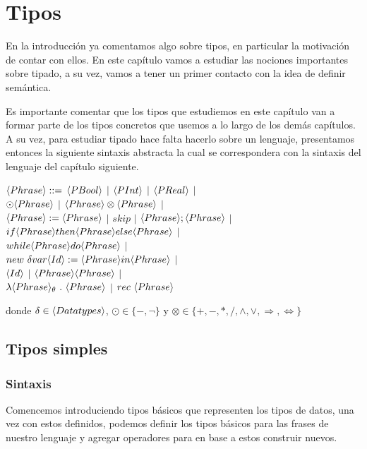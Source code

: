 \chapter{Tipos}
\label{chap:types}

En la introducci\'on ya comentamos algo sobre tipos, en particular la 
motivaci\'on de contar con ellos. En este cap\'itulo vamos a estudiar las 
nociones importantes sobre tipado, a su vez, vamos a tener un primer contacto
con la idea de definir sem\'antica. \

Es importante comentar que los tipos que estudiemos en este cap\'itulo van
a formar parte de los tipos concretos que usemos a lo largo de los dem\'as
cap\'itulos. A su vez, para estudiar tipado hace falta hacerlo sobre un
lenguaje, presentamos entonces la siguiente sintaxis abstracta la cual
se correspondera con la sintaxis del lenguaje del cap\'itulo siguiente.

\begin{center} 

$\langle Phrase \rangle ::=$ $\langle PBool \rangle$ $|$ $\langle PInt \rangle$ $|$ $\langle PReal \rangle$ $|$ \\
$\odot \langle Phrase \rangle$ $|$ $\langle Phrase \rangle \otimes \langle Phrase \rangle $ $|$ \\
$\langle Phrase \rangle := \langle Phrase \rangle$ $|$ $skip$ $|$ $\langle Phrase \rangle;\langle Phrase \rangle$ $|$ \\
$if \langle Phrase \rangle then \langle Phrase \rangle else \langle Phrase \rangle$ $|$\\
$while \langle Phrase \rangle do \langle Phrase \rangle$ $|$ \\
$new \ \delta var \langle Id \rangle := \langle Phrase \rangle in \langle Phrase \rangle$ $|$\\
$\langle Id \rangle$ $|$ $\langle Phrase \rangle\langle Phrase \rangle$ $|$\\
$\lambda \lrangles{Phrase}_\theta \ . \ \lrangles{Phrase} $ $|$ $rec \ \langle Phrase \rangle$

\end{center}

donde $\delta \in \langle Data types \rangle$, $\odot \in \{-, \neg\}$ y 
$\otimes \in \{+,-,*,/,\wedge,\vee,\Rightarrow,\Leftrightarrow\}$

\section{Tipos simples}

\subsection{Sintaxis}
Comencemos introduciendo tipos b\'asicos que representen los tipos de datos,
una vez con estos definidos, podemos definir los tipos b\'asicos para las
frases de nuestro lenguaje y agregar operadores para en base a estos
construir nuevos.\

